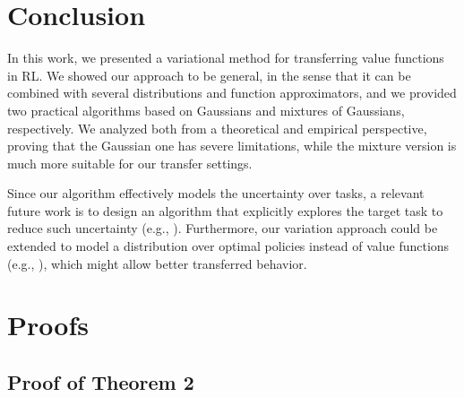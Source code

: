 \documentclass{article}
\begin{document}
\section{Conclusion}

In this work, we presented a variational method for transferring value functions in RL. We showed our approach to be general, in the sense that it can be combined with several distributions and function approximators, and we provided two practical algorithms based on Gaussians and mixtures of Gaussians, respectively. We analyzed both from a theoretical and empirical perspective, proving that the Gaussian one has severe limitations, while the mixture version is much more suitable for our transfer settings.

Since our algorithm effectively models the uncertainty over tasks, a relevant future work is to design an algorithm that explicitly explores the target task to reduce such uncertainty (e.g., \cite{houthooft2016vime}). Furthermore, our variation approach could be extended to model a distribution over optimal policies instead of value functions (e.g., \cite{liu2017stein}), which might allow better transferred behavior.

{\small 


}

\newpage
\appendix

\section{Proofs}

\subsection{Proof of Theorem 2}
\end{document}
